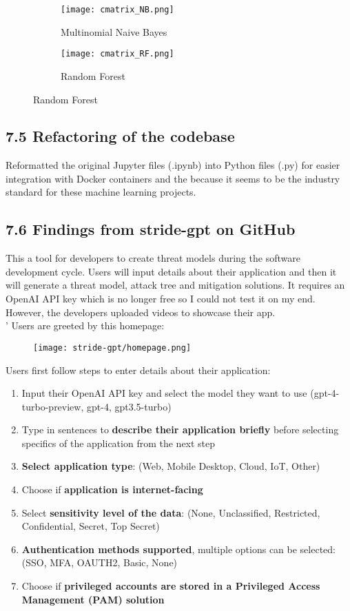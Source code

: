 \begin{figure}[htbp]
    \centering
    \begin{subfigure}[b]{0.45\textwidth}
        \texttt{[image: cmatrix\_NB.png]}
        \caption{Multinomial Naive Bayes}
    \end{subfigure}
    \hfill
    \begin{subfigure}[b]{0.45\textwidth}
        \texttt{[image: cmatrix\_RF.png]}
        \caption{Random Forest}
    \end{subfigure}
\end{figure}


\subsection*{7.5 Refactoring of  the codebase}
Reformatted the original Jupyter files (.ipynb) into Python files (.py) for easier integration with Docker containers and the because it seems to be the industry standard for these machine learning projects.

\subsection*{7.6 Findings from stride-gpt on GitHub}
This a tool for developers to create threat models during the software development cycle. Users will input details about their application and then it will generate a threat model, attack tree and mitigation solutions. It requires an OpenAI API key which is no longer free so I could not test it on my end. However, the developers uploaded videos to showcase their app. \\'
Users are greeted by this homepage:
\begin{figure}[htbp]
    \centering
    \texttt{[image: stride-gpt/homepage.png]}
\end{figure}

Users first follow steps to enter details about their application:
\begin{enumerate}[topsep=0pt]
    \item Input their OpenAI API key and select the model they want to use (gpt-4-turbo-preview, gpt-4, gpt3.5-turbo)
    \item Type in sentences to \textbf{describe their application briefly} before selecting specifics of the application from the next step
    \item \textbf{Select application type}: (Web, Mobile Desktop, Cloud, IoT, Other)
    \item Choose if \textbf{application is internet-facing}
    \item Select \textbf{sensitivity level of the data}: (None, Unclassified, Restricted, Confidential, Secret, Top Secret)
    \item \textbf{Authentication methods supported}, multiple options can be selected: (SSO, MFA, OAUTH2, Basic, None)
    \item Choose if \textbf{privileged accounts are stored in a Privileged Access Management (PAM) solution}
\end{enumerate}
\clearpage


